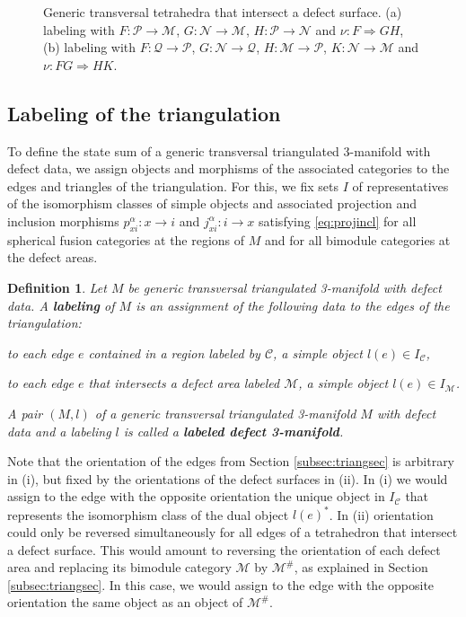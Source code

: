 \documentclass[1.5pt, a4paper]{article}
\newcommand{\mac}{\mathcal C}
\newcommand{\mam}{\mathcal M}
\newcommand{\man}{\mathcal N}
\newcommand{\map}{\mathcal P}
\newcommand{\maq}{\mathcal Q}
\newtheorem{definition}[theorem]{Definition}
\begin{document}
\begin{figure} 
\centering
\def\svgwidth{.75\columnwidth}

\caption{Generic transversal tetrahedra that intersect a defect surface. \newline
(a) labeling with  $F:\mathcal P\to\mam$, $G:\man\to\mam$, $H:\map\to\man$ and  $\nu:F\Rightarrow GH$,\newline
(b) labeling with  $F:\maq\to \map$, $G:\man\to\maq$, $H:\mam\to\map$, $K:\man\to\mam$ and  $\nu: FG\Rightarrow HK$.
}
\label{fig:dectet}
\end{figure}

\subsection{Labeling of the triangulation}



To define the state sum of a generic  transversal    triangulated 3-manifold with defect data, we assign   objects and morphisms of the associated categories to the edges and triangles of the triangulation. For this,  we fix sets  $I$ of representatives of the isomorphism classes of simple objects and associated projection and inclusion morphisms $p^\alpha_{xi}: x\to i$ and $j^\alpha_{xi}: i\to x$ satisfying \eqref{eq:projincl} 
 for all spherical fusion categories at the regions of $M$ and for all bimodule categories at the defect areas.

\begin{definition} \label{def:label} Let $M$ be generic transversal   triangulated 3-manifold with defect data. A {\bf labeling} of $M$  is an assignment of the following data to the edges of the triangulation:
\begin{compactenum}[(i)]
\item to each 
edge $e$ contained in a region labeled by  $\mac$, a simple object $l(e)\in I_{\mac}$,
\item to each  
edge $e$ that intersects a defect area labeled $\mam$, a  simple object $l(e)\in I_{\mam}$.
\end{compactenum}
A  pair $(M,l)$ of a generic  transversal  triangulated 3-manifold $M$ with defect data  and a labeling $l$ is called a {\bf labeled defect 3-manifold}.
\end{definition}

Note that the orientation of the edges  from Section \ref{subsec:triangsec}  is arbitrary in (i), but fixed by the orientations of the defect  surfaces  in (ii). In (i) we would assign to the edge with the opposite orientation the unique object in $I_\mac$ that represents the isomorphism class of the dual object $l(e)^*$. In (ii) orientation could only be reversed simultaneously for all edges of a tetrahedron  that intersect a  defect surface. This would amount to reversing the orientation of each defect area  and replacing its bimodule category $\mathcal M$ by $\mathcal M^\#$, as explained in Section \ref{subsec:triangsec}.
In this case, we would assign to the edge with the opposite orientation  the same object as an object of  $\mam^\#$.
\end{document}
